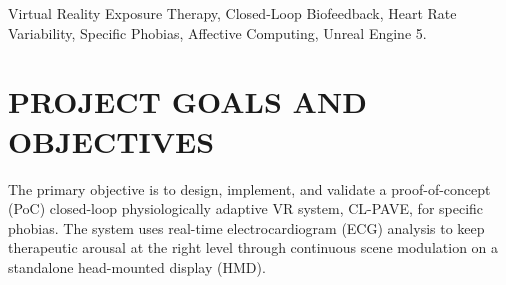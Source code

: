 \documentclass[conference]{IEEEtran}
\begin{document}
\begin{abstract}
Mental health disorders affect approximately one in eight individuals globally, and treatment access in low- and middle-income countries remains severely limited. Specific phobias carry a lifetime prevalence of 7--12\% and impose significant clinical and socioeconomic burdens. Current virtual reality exposure therapy systems deliver stimuli at fixed intensities with no real-time physiological feedback, leaving a critical gap in adaptive therapeutic control.

This proposal describes CL-PAVE, a closed-loop physiologically adaptive virtual reality system. It reads continuous electrocardiogram data from a Polar H10 chest-strap sensor, extracts heart rate variability features in a Python inference layer, and sends a continuous arousal regression score to a standalone Meta Quest 3S running an Unreal Engine 5 therapeutic environment.

The system modulates in-scene stimulus parameters in real time, including ambient audio intensity, animation speed, and stimulus density, to keep physiological arousal within the therapeutic window defined by the inhibitory learning model of exposure therapy. Two phobia scenarios will validate the generalizability of the architecture.

The expected outcome is a working proof-of-concept showing that a fully mobile closed-loop biofeedback system can regulate therapeutic arousal with sub-second latency, filling a clear gap in current virtual reality therapy and laying groundwork for expansion to additional phobia subtypes.
\end{abstract}

\begin{IEEEkeywords}
Virtual Reality Exposure Therapy, Closed-Loop Biofeedback, Heart Rate Variability, Specific Phobias, Affective Computing, Unreal Engine 5.
\end{IEEEkeywords}

\section{PROJECT GOALS AND OBJECTIVES}

The primary objective is to design, implement, and validate a proof-of-concept (PoC) closed-loop physiologically adaptive VR system, CL-PAVE, for specific phobias. The system uses real-time electrocardiogram (ECG) analysis to keep therapeutic arousal at the right level through continuous scene modulation on a standalone head-mounted display (HMD).
\end{document}
